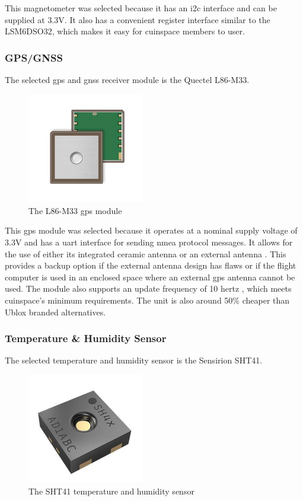 This magnetometer was selected because it has an \gls{i2c} interface and can be supplied at 3.3V. \cite{lis2mdl-datasheet} It also has a convenient register interface similar to the LSM6DSO32, which makes it easy for \gls{cuinspace} members to user.

\subsubsection{GPS/GNSS}

The selected \gls{gps} and \gls{gnss} receiver module is the Quectel L86-M33.

\begin{figure}[H]
    \center
    \includegraphics[width=2in]{assets/images/l86m33.png}
    \caption{The L86-M33 \gls{gps} module \cite{gps-pic}}
    \label{fig:gps}
\end{figure}

This \gls{gps} module was selected because it operates at a nominal supply voltage of 3.3V \cite{gps-datasheet} and has a \gls{uart} interface for sending \gls{nmea} protocol messages. \cite{gps-datasheet} It allows for the use of either its integrated ceramic antenna or an external antenna \cite{gps-datasheet}. This provides a backup option if the external antenna design has flaws or if the flight computer is used in an enclosed space where an external \gls{gps} antenna cannot be used. The module also supports an update frequency of 10 hertz \cite{gps-datasheet}, which meets \gls{cuinspace}'s minimum requirements. The unit is also around 50\% cheaper than Ublox branded alternatives.

\subsubsection{Temperature \& Humidity Sensor}

The selected temperature and humidity sensor is the Sensirion SHT41.

\begin{figure}[H]
    \centering
    \includegraphics[width=2in]{assets/images/sht41.jpg}
    \caption{The SHT41 temperature and humidity sensor \cite{sht41-pic}}
\end{figure}

